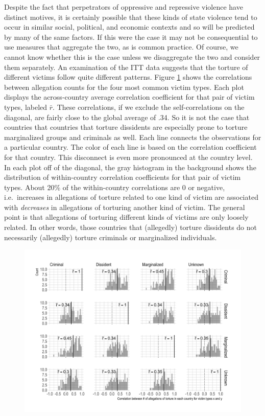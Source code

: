 \documentclass[11pt]{article}
\begin{document}
Despite the fact that perpetrators of oppressive and repressive violence have distinct motives, it is certainly possible that these kinds of state violence tend to occur in similar social, political, and economic contexts and so will be predicted by many of the same factors. If this were the case it may not be consequential to use measures that aggregate the two, as is common practice. Of course, we cannot know whether this is the case unless we disaggregate the two and consider them separately. An examination of the ITT data suggests that the torture of different victims follow quite different patterns. Figure \ref{fig:correlation-matrix} shows the correlations between allegation counts for the four most common victim types. Each plot displays the across-country average correlation coefficient for that pair of victim types, labeled $\bar{r}$. These correlations, if we exclude the self-correlations on the diagonal, are fairly close to the global average of .34. So it is not the case that countries that countries that torture dissidents are especially prone to torture marginalized groups and criminals as well. 
Each line connects the observations for a particular country. The color of each line is based on the correlation coefficient for that country. This disconnect is even more pronounced at the country level. In each plot off of the diagonal, the gray histogram in the background shows the distribution of within-country correlation coefficients for that pair of victim types. About 20\% of the within-country correlations are 0 or negative, i.e.\ increases in allegations of torture related to one kind of victim are associated with {\em decreases} in allegations of torturing another kind of victim. The general point is that allegations of torturing different kinds of victims are only loosely related. In other words, those countries that (allegedly) torture dissidents  do not necessarily (allegedly) torture criminals or marginalized individuals. 

\begin{figure}
\begin{center}
\caption{}
\label{fig:correlation-matrix}
\includegraphics[width=.99\textwidth]{../output/figures/allegations-by-victim-pairwise-correlations.png}
\end{center}
\end{figure}
\end{document}
